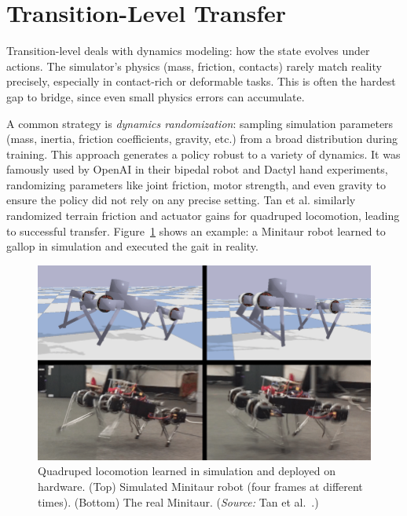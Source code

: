 \section{Transition-Level Transfer}
Transition-level \simtoreal deals with dynamics modeling: how the state evolves under actions. The simulator’s physics (mass, friction, contacts) rarely match reality precisely, especially in contact-rich or deformable tasks. This is often the hardest gap to bridge, since even small physics errors can accumulate.

A common strategy is \emph{dynamics randomization}: sampling simulation parameters (mass, inertia, friction coefficients, gravity, etc.) from a broad distribution during training. This approach generates a policy robust to a variety of dynamics. It was famously used by OpenAI in their bipedal robot and Dactyl hand experiments, randomizing parameters like joint friction, motor strength, and even gravity to ensure the policy did not rely on any precise setting\cite{Akkaya2019}. Tan et al. similarly randomized terrain friction and actuator gains for quadruped locomotion, leading to successful transfer\cite{Tan2018}. Figure~\ref{fig:quadruped} shows an example: a Minitaur robot learned to gallop in simulation and executed the gait in reality.


\begin{figure}[H]
    \centering
    \includegraphics[width=0.95\linewidth]{figures/figMinitaurGallop.png}
    \caption{Quadruped locomotion learned in simulation and deployed on hardware.  (Top) Simulated Minitaur robot (four frames at different times). (Bottom) The real Minitaur. (\emph{Source:} Tan et al.~\cite{Tan2018}.)}
    \label{fig:quadruped}
\end{figure}

